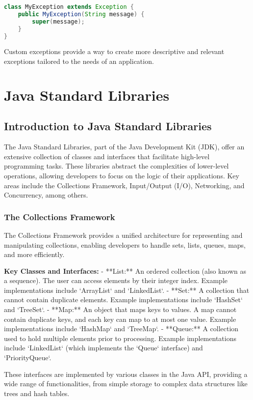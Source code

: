 \documentclass{article}
\begin{document}
\begin{lstlisting}[language=Java]
class MyException extends Exception {
    public MyException(String message) {
        super(message);
    }
}
\end{lstlisting}

Custom exceptions provide a way to create more descriptive and relevant exceptions tailored to the needs of an application.



\section{Java Standard Libraries}
\subsection{Introduction to Java Standard Libraries}
The Java Standard Libraries, part of the Java Development Kit (JDK), offer an extensive collection of classes and interfaces that facilitate high-level programming tasks. These libraries abstract the complexities of lower-level operations, allowing developers to focus on the logic of their applications. Key areas include the Collections Framework, Input/Output (I/O), Networking, and Concurrency, among others.

\subsubsection{The Collections Framework}
The Collections Framework provides a unified architecture for representing and manipulating collections, enabling developers to handle sets, lists, queues, maps, and more efficiently.

\textbf{Key Classes and Interfaces:}
- **List:** An ordered collection (also known as a sequence). The user can access elements by their integer index. Example implementations include `ArrayList` and `LinkedList`.
- **Set:** A collection that cannot contain duplicate elements. Example implementations include `HashSet` and `TreeSet`.
- **Map:** An object that maps keys to values. A map cannot contain duplicate keys, and each key can map to at most one value. Example implementations include `HashMap` and `TreeMap`.
- **Queue:** A collection used to hold multiple elements prior to processing. Example implementations include `LinkedList` (which implements the `Queue` interface) and `PriorityQueue`.

These interfaces are implemented by various classes in the Java API, providing a wide range of functionalities, from simple storage to complex data structures like trees and hash tables.
\end{document}
